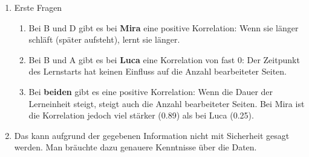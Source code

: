 \begin{myexercise}
	\begin{myanswer}
		\begin{enumerate}
			\item Erste Fragen
			      \begin{enumerate}
				      \item Bei B und D gibt es bei \textbf{Mira} eine positive Korrelation: Wenn sie länger schläft (später aufsteht), lernt sie länger.
				      \item Bei B und A gibt es bei \textbf{Luca} eine Korrelation von fast 0: Der Zeitpunkt des Lernstarts hat keinen Einfluss auf die Anzahl bearbeiteter Seiten.
				      \item Bei \textbf{beiden} gibt es eine positive Korrelation: Wenn die Dauer der Lerneinheit steigt, steigt auch die Anzahl bearbeiteter Seiten. Bei Mira ist die Korrelation jedoch viel stärker (0.89) als bei Luca (0.25).
			      \end{enumerate}
			\item Das kann aufgrund der gegebenen Information nicht mit Sicherheit gesagt werden. Man bräuchte dazu genauere Kenntnisse über die Daten.
		\end{enumerate}
	\end{myanswer}
\end{myexercise}